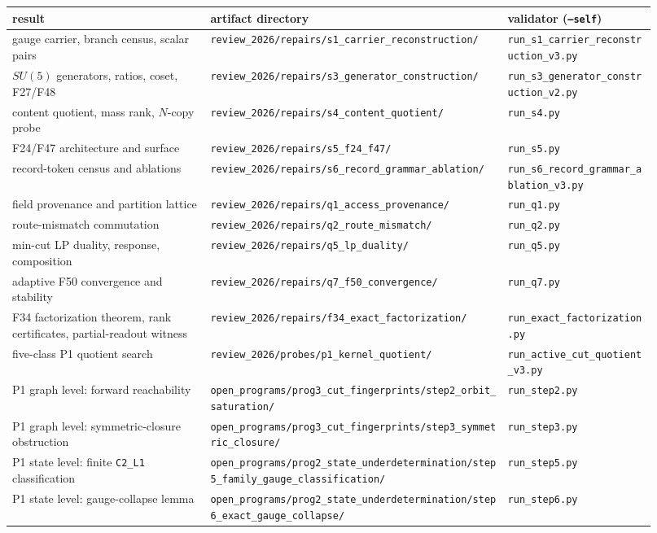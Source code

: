 \documentclass[11pt]{article}
\theoremstyle{definition}
\begin{document}
\begin{center}
\small
\begin{longtable}[]{@{}p{0.29\linewidth}p{0.42\linewidth}p{0.21\linewidth}@{}}
\toprule
result & artifact directory & validator (\texttt{--self})\\
\midrule
\endhead
gauge carrier, branch census, scalar pairs &
\nolinkurl{review_2026/repairs/s1_carrier_reconstruction/} &
\nolinkurl{run_s1_carrier_reconstruction_v3.py}\\
\(SU(5)\) generators, ratios, coset, F27/F48 &
\nolinkurl{review_2026/repairs/s3_generator_construction/} &
\nolinkurl{run_s3_generator_construction_v2.py}\\
content quotient, mass rank, \(N\)-copy probe &
\nolinkurl{review_2026/repairs/s4_content_quotient/} &
\nolinkurl{run_s4.py}\\
F24/F47 architecture and surface &
\nolinkurl{review_2026/repairs/s5_f24_f47/} &
\nolinkurl{run_s5.py}\\
record-token census and ablations &
\nolinkurl{review_2026/repairs/s6_record_grammar_ablation/} &
\nolinkurl{run_s6_record_grammar_ablation_v3.py}\\
field provenance and partition lattice &
\nolinkurl{review_2026/repairs/q1_access_provenance/} &
\nolinkurl{run_q1.py}\\
route-mismatch commutation &
\nolinkurl{review_2026/repairs/q2_route_mismatch/} &
\nolinkurl{run_q2.py}\\
min-cut LP duality, response, composition &
\nolinkurl{review_2026/repairs/q5_lp_duality/} &
\nolinkurl{run_q5.py}\\
adaptive F50 convergence and stability &
\nolinkurl{review_2026/repairs/q7_f50_convergence/} &
\nolinkurl{run_q7.py}\\
F34 factorization theorem, rank certificates, partial-readout witness &
\nolinkurl{review_2026/repairs/f34_exact_factorization/} &
\nolinkurl{run_exact_factorization.py}\\
five-class P1 quotient search &
\nolinkurl{review_2026/probes/p1_kernel_quotient/} &
\nolinkurl{run_active_cut_quotient_v3.py}\\
P1 graph level: forward reachability &
\nolinkurl{open_programs/prog3_cut_fingerprints/step2_orbit_saturation/} &
\nolinkurl{run_step2.py}\\
P1 graph level: symmetric-closure obstruction &
\nolinkurl{open_programs/prog3_cut_fingerprints/step3_symmetric_closure/} &
\nolinkurl{run_step3.py}\\
P1 state level: finite \texttt{C2\_L1} classification &
\nolinkurl{open_programs/prog2_state_underdetermination/step5_family_gauge_classification/} &
\nolinkurl{run_step5.py}\\
P1 state level: gauge-collapse lemma &
\nolinkurl{open_programs/prog2_state_underdetermination/step6_exact_gauge_collapse/} &
\nolinkurl{run_step6.py}\\
\bottomrule
\end{longtable}
\end{center}
\end{document}
